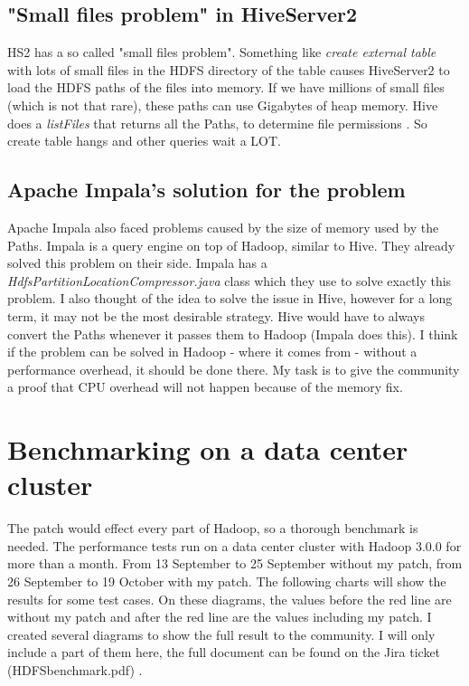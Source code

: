 \subsection{"Small files problem" in HiveServer2}
HS2 has a so called "small files problem". Something like \textit{create external table} with lots of small files in the  HDFS directory of the table causes HiveServer2 to load the HDFS paths of the files into memory. If we have millions of small files (which is not that rare), these paths can use Gigabytes of heap memory. Hive does a \textit{listFiles} that returns all the Paths, to determine file permissions \etc. So create table hangs and other queries wait a LOT.

\subsection{Apache Impala's solution for the problem}
Apache Impala also faced problems caused by the size of memory used by the Paths. Impala is a query engine on top of Hadoop, similar to Hive. They already solved this problem on their side. Impala has a \textit{HdfsPartitionLocationCompressor.java} class which they use to solve exactly this problem. I also thought of the idea to solve the issue in Hive, however for a long term, it may not be the most desirable strategy. Hive would have to always convert the Paths whenever it passes them to Hadoop (Impala does this). I think if the problem can be solved in  Hadoop - where it comes from - without a performance overhead, it should be done there. My task is to give the community a proof that CPU overhead will not happen because of the memory fix. 

\section{Benchmarking on a data center cluster}
The patch would effect every part of Hadoop, so a thorough benchmark is needed. The performance tests run on a data center cluster with Hadoop 3.0.0 for more than a month. From 13 September to 25 September without my patch, from 26 September to 19 October with my patch. The following charts will show the results for some test cases. On these diagrams, the values before the red line are without my patch and after the red line are the values including my patch. I created several diagrams to show the full result to the community. I will only include a part of them here, the full document can be found on the Jira ticket (HDFSbenchmark.pdf) \cite{hdfs-path}.

